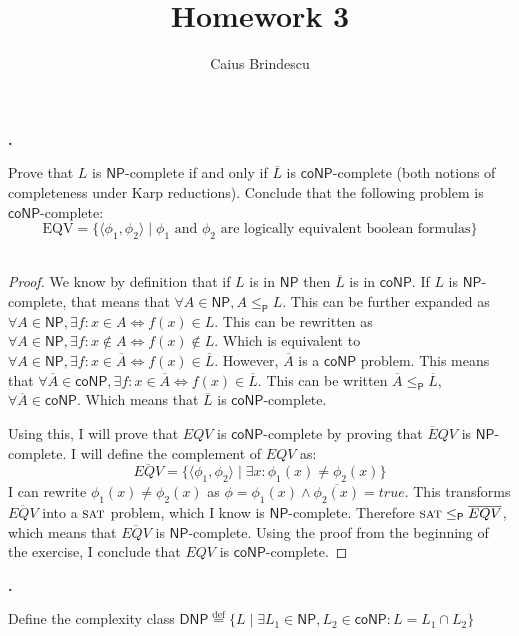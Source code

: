 \documentclass[letterpaper,11pt]{article}
\title{Homework 3}
\author{Caius Brindescu}
\newcommand{\cc}[1]{\ensuremath{\textsf{#1}}\xspace}
\newcommand{\NP}{\cc{NP}}
\newcommand{\coNP}{\cc{coNP}}
\newcommand{\karp}{\le_{\textsf{P}}}
\newcommand{\prob}[1]{\ensuremath{\textsc{#1}}\xspace}
\newcommand{\SAT}{\prob{sat}}
\newcounter{problem}
\newenvironment{problem}%
{%
	\stepcounter{problem}%
	\textbf{\theproblem.}
	\large
}{\normalsize~\\}%
\begin{document}
\maketitle

\begin{problem}
Prove that $L$ is $\NP$-complete if and only if $\overline L$ is $\coNP$-complete (both notions of completeness under Karp reductions). Conclude that the following problem is $\coNP$-complete:
\[
    \mbox{EQV} = \{ \langle \phi_1, \phi_2 \rangle \mid \phi_1 \mbox{ and } \phi_2 \mbox{ are logically equivalent boolean formulas} \}
\]
\end{problem}
\vspace{-20pt}

\begin{proof}

We know by definition that if $L$ is in $\NP$ then $\overline L$ is in $\coNP$.
If $L$ is $\NP$-complete, that means that $\forall A \in \NP, A \karp L$.
This can be further expanded as $\forall A \in \NP, \exists f : x \in A \iff f(x) \in L$.
This can be rewritten as $\forall A \in \NP, \exists f : x \notin A \iff f(x) \notin L$.
Which is equivalent to $\forall A \in \NP, \exists f : x \in {\overline A} \iff f(x) \in {\overline L}$.
However, $\overline A$ is a $\coNP$ problem.
This means that $\forall {\overline A} \in \coNP, \exists f:x \in {\overline A} \iff f(x) \in {\overline L}$.
This can be written ${\overline A} \karp {\overline L}$, $\forall {\overline A} \in \coNP$.
Which means that $\overline L$ is $\coNP$-complete.

Using this, I will prove that $EQV$ is $\coNP$-complete by proving that $\overline EQV$ is $\NP$-complete.
I will define the complement of $EQV$ as:
\[
	\overline{EQV} = \{ \langle \phi_1, \phi_2 \rangle \mid \exists x : \phi_1 (x) \neq \phi_2 (x) \}
\]
I can rewrite $\phi_1 (x) \neq \phi_2 (x)$ as $\phi = \phi_1 (x) \wedge \overline{\phi_2 (x) }=true$.
This transforms $\overline{EQV}$ into a $\SAT$ problem, which I know is $\NP$-complete.
Therefore $\SAT \karp \overline{EQV}$, which means that $\overline{EQV}$ is $\NP$-complete.
Using the proof from the beginning of the exercise, I conclude that $EQV$ is $\coNP$-complete.
\end{proof}

\newcommand{\DNP}{\cc{DNP}}
\begin{problem}
Define the complexity class
$
    \cc{DNP} \overset{\text{def}}= \{ L \mid \exists L_1 \in \NP, L_2 \in \coNP : L = L_1 \cap L_2 \}
$
\end{problem}
\end{document}
